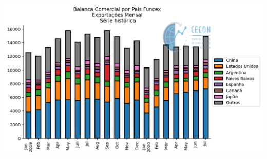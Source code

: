 \documentclass[11pt]{article}
\begin{document}
\begin{center}
\includegraphics[width=.9\linewidth]{obipy-resources/62e383af79e91b63c7fc98dd7fb55b3c3ececcb9/94e3a318f5fa3b548791774e379fcc93c0ac6151.png}
\end{center}
\end{document}
